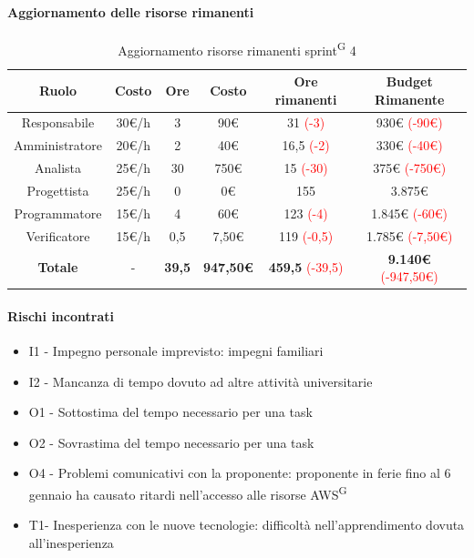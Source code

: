 \documentclass[a4paper, 11pt]{article}
\newcommand{\subsubsubsection}[1]{\paragraph{#1}}
\renewcommand{\arraystretch}{1.4} %
\begin{document}
\subsubsubsection{Aggiornamento delle risorse rimanenti}
\begin{table}[H]
    \centering
    \renewcommand{\arraystretch}{1.5}
    
    \begin{tabular}{|c|c|c|c|c|c|}
        \hline
        \textcolor{AccentColor}{\textbf{Ruolo}} &
        \textcolor{AccentColor}{\textbf{Costo}} &
        \textcolor{AccentColor}{\textbf{Ore}} &
        \textcolor{AccentColor}{\textbf{Costo}} &
        \textcolor{AccentColor}{\textbf{Ore rimanenti}} &
        \textcolor{AccentColor}{\textbf{Budget Rimanente}} \\ \hline
        
        Responsabile & 30€/h & 3 & 90€ & 31 \textcolor{red}{(-3)} & 930€ \textcolor{red}{(-90€)}\\ \hline
        
        Amministratore & 20€/h & 2 & 40€ & 16,5 \textcolor{red}{(-2)} & 330€ \textcolor{red}{(-40€)} \\ \hline
        
        Analista & 25€/h & 30 & 750€ & 15 \textcolor{red}{(-30)} & 375€ \textcolor{red}{(-750€)}\\ \hline
        
        Progettista & 25€/h & 0 & 0€ & 155 & 3.875€ \\ \hline
        
        Programmatore & 15€/h & 4 & 60€ & 123 \textcolor{red}{(-4)} & 1.845€ \textcolor{red}{(-60€)} \\ \hline
        
        Verificatore & 15€/h & 0,5 & 7,50€ & 119 \textcolor{red}{(-0,5)}& 1.785€ \textcolor{red}{(-7,50€)} \\ \hline
        
        \textbf{Totale} & - & \textbf{39,5} & \textbf{947,50€} & \textbf{459,5} \textcolor{red}{(-39,5)} & \textbf{9.140€} \textcolor{red}{(-947,50€)}\\ \hline
    \end{tabular}
    \caption{Aggiornamento risorse rimanenti sprint\textsuperscript{G} 4}
\end{table}
\subsubsubsection{Rischi incontrati}
\begin{itemize}
  \item I1 - Impegno personale imprevisto: impegni familiari
  \item I2 - Mancanza di tempo dovuto ad altre attività universitarie
  \item O1 - Sottostima del tempo necessario per una task
  \item O2 - Sovrastima del tempo necessario per una task
  \item O4 - Problemi comunicativi con la proponente: proponente in ferie fino al 6 gennaio ha causato ritardi nell'accesso alle risorse AWS\textsuperscript{G}
  \item T1- Inesperienza con le nuove tecnologie: difficoltà nell'apprendimento dovuta all'inesperienza
\end{itemize}
\end{document}
